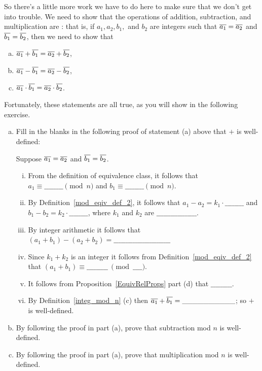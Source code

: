 So there's a little more work we have to do here to make sure that we don't get into trouble. We need to show that  the operations of addition, subtraction, and multiplication are : that is, if $a_1, a_2, b_1,$ and $b_2$ are integers such that  $\overline{a_1} = \overline{a_2}$ and $\overline{b_1} = \overline{b_2}$, then we need to show that
\begin{enumerate}[(a)]
\item $\overline{a_1} \mathbin{+} \overline{b_1} = \overline{a_2} \mathbin{+} \overline{b_2}$,
\item $\overline{a_1} \mathbin{-} \overline{b_1} = \overline{a_2} \mathbin{-} \overline{b_2}$, 
\item $\overline{a_1} \cdot \overline{b_1} = \overline{a_2} \cdot \overline{b_2}$.
\end{enumerate}
Fortunately, these statements are all true, as you will show in the following exercise.

\begin{exercise}\label{exercise:EquivalenceRelationsChap:54} 
\begin{enumerate}[(a)]
\item 
Fill in the blanks in the following proof of statement (a) above that $\mathbin{+}$ is well-defined: 

Suppose $\overline{a_1} = \overline{a_2}$ and $\overline{b_1} = \overline{b_2}$. 
\begin{enumerate}[(i)]
\item
From the definition of equivalence class, it follows that  $a_1 \equiv \_\_\_\_\_\_\_\_ \pmod{n}$ and $b_1 \equiv \_\_\_\_\_\_\_\_ \pmod{n}$. 
\item  
By Definition~\ref{mod_eqiv_def_2}, it follows that 
$a_1 - a_2 = k_1 \cdot \_\_\_\_\_\_\_\_$ and $b_1 - b_2 = k_2 \cdot \_\_\_\_\_\_\_\_$, where $k_1$ and $k_2$ are $\_\_\_\_\_\_\_\_\_\_\_\_\_\_\_\_\_$. 
\item
By integer arithmetic it follows that $(a_1 + b_1) - (a_2 + b_2) =  \_\_\_\_\_\_\_\_\_\_\_\_\_\_\_\_\_\_\_\_\_\_\_\_$
\item
Since $k_1 + k_2$ is an integer it follows from Definition~\ref{mod_eqiv_def_2} that $(a_1 + b_1) \equiv \_\_\_\_\_\_\_\_\_\ \pmod{\_\_\_\_}$.
\item 
It follows from Proposition~\ref{EquivRelProps} part (d) that $\_\_\_\_\_\_\_\_\_$.
\item
By Definition~\ref{integ_mod_n} (c) then $\overline{a_1} \mathbin{+} \overline{b_1} =  \_\_\_\_\_\_\_\_\_\_$; so $\mathbin{+}$ is well-defined.
\end{enumerate}
\item By following the proof in part (a), prove that subtraction mod $n$ is well-defined.
\item By following the proof in part (a), prove that multiplication mod $n$ is well-defined.
\end{enumerate}
\end{exercise}

